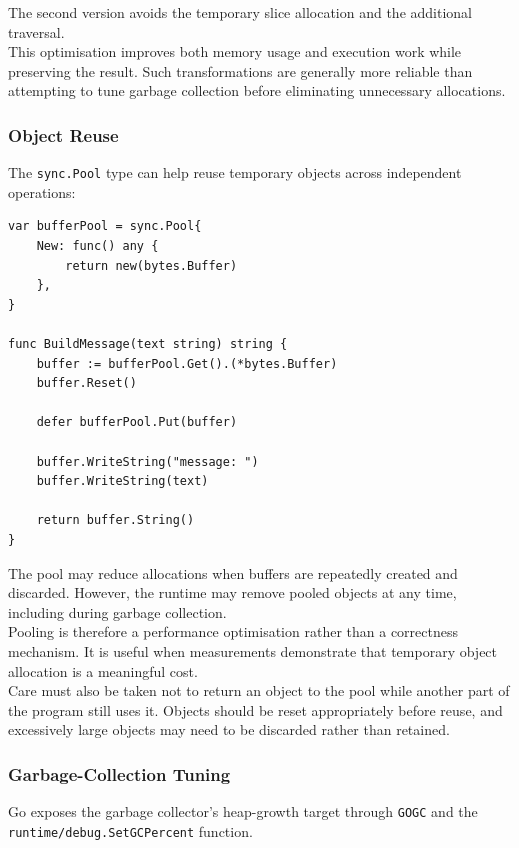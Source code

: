 The second version avoids the temporary slice allocation and the additional traversal.\\

This optimisation improves both memory usage and execution work while preserving the result. Such transformations are generally more reliable than attempting to tune garbage collection before eliminating unnecessary allocations.

\subsubsection{Object Reuse}

The \texttt{sync.Pool} type can help reuse temporary objects across independent operations:

\begin{lstlisting}
var bufferPool = sync.Pool{
    New: func() any {
        return new(bytes.Buffer)
    },
}

func BuildMessage(text string) string {
    buffer := bufferPool.Get().(*bytes.Buffer)
    buffer.Reset()

    defer bufferPool.Put(buffer)

    buffer.WriteString("message: ")
    buffer.WriteString(text)

    return buffer.String()
}
\end{lstlisting}

The pool may reduce allocations when buffers are repeatedly created and discarded. However, the runtime may remove pooled objects at any time, including during garbage collection.\\

Pooling is therefore a performance optimisation rather than a correctness mechanism. It is useful when measurements demonstrate that temporary object allocation is a meaningful cost.\\

Care must also be taken not to return an object to the pool while another part of the program still uses it. Objects should be reset appropriately before reuse, and excessively large objects may need to be discarded rather than retained.\\

\subsubsection{Garbage-Collection Tuning}

Go exposes the garbage collector's heap-growth target through \texttt{GOGC} and the \texttt{runtime/debug.SetGCPercent} function.

